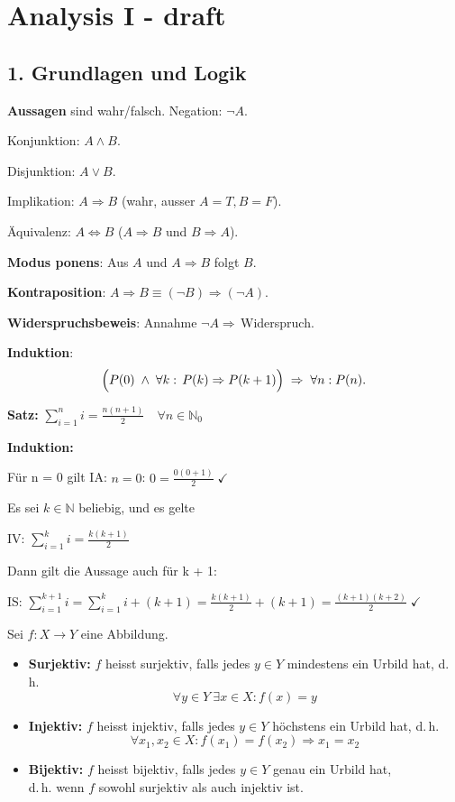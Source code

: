 \section{Analysis I - draft}

\subsection{1. Grundlagen und Logik}
\textbf{Aussagen} sind wahr/falsch.  
Negation: $\lnot A$.  

Konjunktion: $A\wedge B$.  

Disjunktion: $A\vee B$.  

Implikation: $A\Rightarrow B$ (wahr, ausser $A=T,B=F$).  

Äquivalenz: $A\Leftrightarrow B$ ($A\Rightarrow B$ und $B\Rightarrow A$). 

\textbf{Modus ponens}: Aus $A$ und $A\Rightarrow B$ folgt $B$.  

\textbf{Kontraposition}: $A\Rightarrow B\equiv(\lnot B)\Rightarrow(\lnot A)$.  

\textbf{Widerspruchsbeweis}: Annahme $\lnot A\Rightarrow\,$Widerspruch.  

\textbf{Induktion}:  
\[
\Bigl(P(0)\;\wedge\;\forall k:\,P(k)\Rightarrow P(k+1)\Bigr)\;\Rightarrow\;\forall n:P(n).
\]

\textbf{Satz:} \(\displaystyle \sum_{i=1}^n i = \frac{n(n+1)}{2} \quad \forall n \in \mathbb{N}_0\)

\textbf{Induktion:}

Für n = 0 gilt
IA: \(n = 0\): \(0 = \frac{0(0+1)}{2}\;\checkmark\)

Es sei $k \in \mathbb{N}$ beliebig, und es gelte

IV: \(\sum_{i=1}^k i = \frac{k(k+1)}{2}\)

Dann gilt die Aussage auch für k + 1:

IS: \(\sum_{i=1}^{k+1} i = \sum_{i=1}^k i + (k+1)
= \frac{k(k+1)}{2} + (k+1)
= \frac{(k+1)(k+2)}{2}\;\checkmark\)

Sei \( f : X \to Y \) eine Abbildung.

\begin{itemize}[left=0pt, itemsep=1.5em]

  \item \textbf{Surjektiv:} \( f \) heisst surjektiv, falls jedes \( y \in Y \) mindestens ein Urbild hat, d.\,h.
  \[
  \forall y \in Y\ \exists x \in X : f(x) = y
  \]

  \item \textbf{Injektiv:} \( f \) heisst injektiv, falls jedes \( y \in Y \) höchstens ein Urbild hat, d.\,h.
  \[
  \forall x_1, x_2 \in X : f(x_1) = f(x_2) \Rightarrow x_1 = x_2
  \]

  \item \textbf{Bijektiv:} \( f \) heisst bijektiv, falls jedes \( y \in Y \) genau ein Urbild hat,\\
  d.\,h. wenn \( f \) sowohl surjektiv als auch injektiv ist.

\end{itemize}

